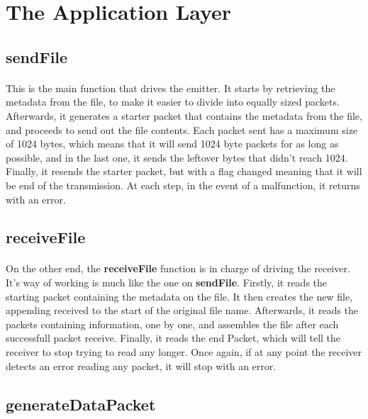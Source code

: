 \documentclass[11pt]{article}
\begin{document}
\section{The Application Layer}

\subsection*{sendFile}

\paragraph{}This is the main function that drives the emitter. It starts by retrieving the metadata from the
file, to make it easier to divide into equally sized packets. Afterwards, it generates a starter
packet that contains the metadata from the file, and proceeds to send out the file contents. Each packet
sent has a maximum size of 1024 bytes, which means that it will send 1024 byte packets for as long as
possible, and in the last one, it sends the leftover bytes that didn't reach 1024. Finally, it resends the
starter packet, but with a flag changed meaning that it will be end of the transmission. At each step, in
the event of a malfunction, it returns with an error.

\subsection*{receiveFile}

\paragraph{}On the other end, the \textbf{receiveFile} function is in charge of driving the receiver. It's
way of working is much like the one on \textbf{sendFile}. Firstly, it reads the starting packet containing
the metadata on the file. It then creates the new file, appending received to the start of the original
file name. Afterwards, it reads the packets containing information, one by one, and assembles the file after
each successfull packet receive. Finally, it reads the end Packet, which will tell the receiver to stop
trying to read any longer. Once again, if at any point the receiver detects an error reading any packet, it
will stop with an error.

\subsection*{generateDataPacket}
\end{document}
